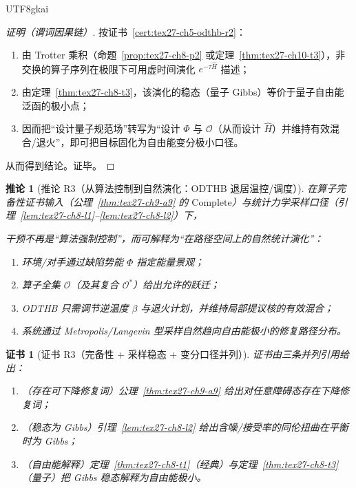 \documentclass[12pt]{article}
\newtheorem{corollary}{推论}[section]
\newtheorem{Certificate}{证书}[section]
\begin{document}
\begin{CJK*}{UTF8}{gkai}
\begin{proof}[证明（谓词因果链）]
按证书~\ref{cert:tex27-ch5-odthb-r2}：
\begin{enumerate}
  \item 由 Trotter 乘积（命题~\ref{prop:tex27-ch8-p2} 或定理~\ref{thm:tex27-ch10-t3}），非交换的算子序列在极限下可用虚时间演化 $e^{-\tau\widehat{H}}$
    描述；
  \item 由定理~\ref{thm:tex27-ch8-t3}，该演化的稳态（量子 Gibbs）等价于量子自由能泛函的极小点；
  \item 因而把“设计量子规范场”转写为“设计 $\Phi$ 与 $\mathcal{O}$（从而设计 $\widehat{H}$）并维持有效混合/退火”，即可把目标固化为自由能变分极小口径。
\end{enumerate}
从而得到结论。证毕。
\end{proof}

\begin{corollary}[推论 R3（从算法控制到自然演化：ODTHB 退居温控/调度）]
\label{cor:tex27-ch5-odthb-r3}
在算子完备性证书输入（公理~\ref{thm:tex27-ch9-a9} 的 $\mathrm{Complete}$）与统计力学采样口径（引理~\ref{lem:tex27-ch8-l1}--\ref{lem:tex27-ch8-l2}）下，

干预不再是“算法强制控制”，而可解释为“在路径空间上的自然统计演化”：
\begin{enumerate}
  \item 环境/对手通过缺陷势能 $\Phi$ 指定能量景观；
  \item 算子全集 $\mathcal{O}$（及其复合 $\mathcal{O}^*$）给出允许的跃迁；
  \item ODTHB 只需调节逆温度 $\beta$ 与退火计划，并维持局部提议核的有效混合；
  \item 系统通过 Metropolis/Langevin 型采样自然趋向自由能极小的修复路径分布。
\end{enumerate}
\end{corollary}

\begin{Certificate}[证书 R3（完备性 + 采样稳态 + 变分口径并列）]
\label{cert:tex27-ch5-odthb-r3}
证书由三条并列引用给出：
\begin{enumerate}
  \item（存在可下降修复词）公理~\ref{thm:tex27-ch9-a9} 给出对任意障碍态存在下降修复词；
  \item（稳态为 Gibbs）引理~\ref{lem:tex27-ch8-l2} 给出含噪/接受率的同伦扭曲在平衡时为 Gibbs；
  \item（自由能解释）定理~\ref{thm:tex27-ch8-t1}（经典）与定理~\ref{thm:tex27-ch8-t3}（量子）把 Gibbs 稳态解释为自由能极小。
\end{enumerate}
\end{Certificate}


\end{CJK*}
\end{document}

